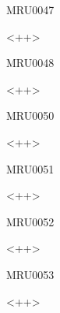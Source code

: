 \documentclass{article}
\begin{document}
\begin{corrige}{MRU0047}

<++>

\end{corrige}%


\begin{corrige}{MRU0048}

<++>

\end{corrige}%




\begin{corrige}{MRU0050}

<++>

\end{corrige}%


\begin{corrige}{MRU0051}

<++>

\end{corrige}%


\begin{corrige}{MRU0052}

<++>

\end{corrige}%


\begin{corrige}{MRU0053}

<++>

\end{corrige}%
\end{document}
